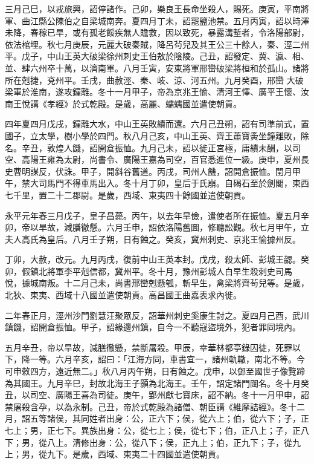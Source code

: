 \begin{pinyinscope}
 三月己巳，以戎旅興，詔停諸作。己卯，樂良王長命坐殺人，賜死。庚寅，平南將軍、曲江縣公陳伯之自梁城南奔。夏四月丁未，詔罷鹽池禁。五月丙寅，詔以時澤未降，春稼已旱，或有孤老餒疾無人贍救，因以致死，暴露溝塹者，令洛陽部尉，依法棺埋。秋七月庚辰，元麗大破秦賊，降呂茍兒及其王公三十餘人，秦、涇二州平。戊子，中山王英大破梁徐州刺史王伯敖於陰陵。己丑，詔發定、冀、瀛、相、並、肆六州卒十萬，以濟南軍。八月壬寅，安東將軍邢巒破梁將桓和於孤山。諸將所在剋捷，兗州平。壬戌，曲赦涇、秦、岐、涼、河五州。九月癸酉，邢巒
 大破梁軍於淮南，遂攻鐘離。冬十一月甲子，帝為京兆王愉、清河王懌、廣平王懷、汝南王悅講《孝經》於式乾殿。是歲，高麗、蠕蠕國並遣使朝貢。



 四年夏四月戊戌，鐘離大水，中山王英敗績而還。六月己丑朔，詔有司準前式，置國子，立太學，樹小學於四門。秋八月己亥，中山王英、齊王蕭寶夤坐鐘離敗，除名。辛丑，敦煌人饑，詔開倉振恤。九月己未，詔以徙正宮極，庸績未酬，以司空、高陽王雍為太尉，尚書令、廣陽王嘉為司空，百官悉進位一級。庚申，夏州長史曹明謀反，伏誅。甲子，開斜谷舊道。丙戌，司州人饑，詔開倉振恤。閏月甲
 午，禁大司馬門不得車馬出入。冬十月丁卯，皇后于氏崩。自碣石至於劍閣，東西七千里，置二十二郡尉。是歲，西域、東夷四十餘國並遣使朝貢。



 永平元年春三月戊子，皇子昌薨。丙午，以去年旱儉，遣使者所在振恤。夏五月辛卯，帝以旱故，減膳徹懸。六月壬申，詔依洛陽舊圖，修聽訟觀。秋七月甲午，立夫人高氏為皇后。八月壬子朔，日有蝕之。癸亥，冀州刺史、京兆王愉據州反。



 丁卯，大赦，改元。九月丙戌，復前中山王英本封。戊戌，殺太師、彭城王勰。癸卯，假鎮北將軍李平剋信都，冀州平。冬十月，豫州彭城人白早生殺刺史司馬
 悅，據城南叛。十二月己未，尚書邢巒剋懸瓠，斬早生，禽梁將齊茍兒等。是歲，北狄、東夷、西域十八國並遣使朝貢。高昌國王曲嘉表求內徙。



 二年春正月，涇州沙門劉慧汪聚眾反，詔華州刺史奚康生討之。夏四月己酉，武川鎮饑，詔開倉振恤。甲子，詔緣邊州鎮，自今一不聽寇盜境外，犯者罪同境內。



 五月辛丑，帝以旱故，減膳徹懸，禁斷屠殺。甲辰，幸華林都亭錄囚徒，死罪以下，降一等。六月辛亥，詔曰：「江海方同，車書宜一，諸州軌轍，南北不等。今可申敕四方，遠近無二。」秋八月丙午朔，日有蝕之。戊申，以鄧至國世子像覽蹄
 為其國王。九月辛巳，封故北海王子顥為北海王。壬午，詔定諸門闥名。冬十月癸丑，以司空、廣陽王喜為司徒。庚午，郢州獻七寶床，詔不納。冬十一月甲申，詔禁屠殺含孕，以為永制。己丑，帝於式乾殿為諸僧、朝臣講《維摩詰經》。冬十二月，詔五等諸侯，其同姓者出身：公，正六下；侯，從六上；伯，從六下；子，正七上；男，正七下。異族出身：公，從七上；侯，從七下；伯，正八上；子，正八下；男，從八上。清修出身：公，從八下；侯，正九上；伯，正九下；子，從九上；男，從九下。是歲，西域、東夷二十四國並遣使朝貢。




\end{pinyinscope}
